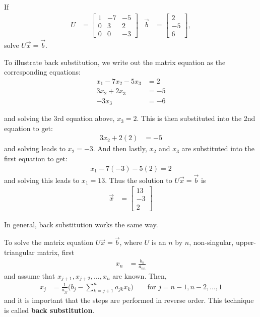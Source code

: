 \begin{example}
If
\begin{align*}
U & = \begin{bmatrix}
1 & -7 & -5 \\
0 & 3 & 2 \\
0 & 0 & -3 
\end{bmatrix} & \vec{b} & = \begin{bmatrix}
2 \\ -5 \\ 6
\end{bmatrix},
\end{align*}
solve $U\vec{x}=\vec{b}$. 

\solution

To illustrate back substitution, we write out the matrix equation as the corresponding equations:
\begin{align*}
x_1 -7x_2 -5x_3 & = 2 \\
3x_2 +2x_3 & = -5 \\
-3 x_3 & = -6 
\end{align*}

and solving the 3rd equation above, $x_3=2$.  This is then substituted into the 2nd equation to get:
\begin{align*}
3x_2 +2(2) & = -5
\end{align*}
and solving leads to $x_2 =-3$.  And then lastly, $x_2$ and $x_3$ are substituted into the first equation to get:
\begin{align*}
x_1 -7(-3)-5(2)=2
\end{align*}
and solving this leads to $x_1=13$.  Thus the solution to $U\vec{x}=\vec{b}$ is
\begin{align*}
\vec{x} & = \begin{bmatrix}
13 \\ -3 \\ 2
\end{bmatrix}
\end{align*}
\end{example}

In general, back substitution works the same way.  

\begin{Boxed*}
To solve the matrix equation $U\vec{x}=\vec{b}$, where $U$ is an $n$ by $n$, non-singular, upper-triangular matrix, first
\begin{align*}
x_n & = \frac{b_n}{a_{nn}}
\end{align*}
and assume that $x_{j+1}, x_{j+2}, \ldots, x_n$ are known.  Then,
\begin{align*}
x_j & = \frac{1}{a_{jj}} \bigl(b_j - \sum_{k=j+1}^n a_{jk} x_k\bigr) \qquad \text{for $j=n-1,n-2,\ldots,1$}
\end{align*}
and it is important that the steps are performed in reverse order.  This technique is called \textbf{back substitution}.
\end{Boxed*}



